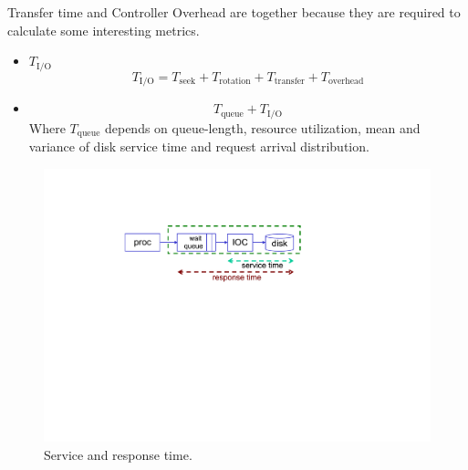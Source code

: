\begin{itemize}
    Transfer time and Controller Overhead are together because they are required to calculate some interesting metrics.
    \begin{itemize}
        \item {} $T_{\text{I/O}}$
        \begin{equation}
            T_{\text{I/O}} = T_{\text{seek}} + T_{\text{rotation}} + T_{\text{transfer}} + T_{\text{overhead}}
        \end{equation}

        \item {}
        \begin{equation}
            T_{\text{queue}} + T_{\text{I/O}}
        \end{equation}
        Where $T_{\text{queue}}$ depends on queue-length, resource utilization, mean and variance of disk service time and request arrival distribution.
    \end{itemize}
    \newpage
    \begin{figure}[!htp]
        \centering
        \includegraphics[width=.7\textwidth]{img/performance-hdd-1.pdf}
        \caption{Service and response time.}
    \end{figure}
\end{itemize}